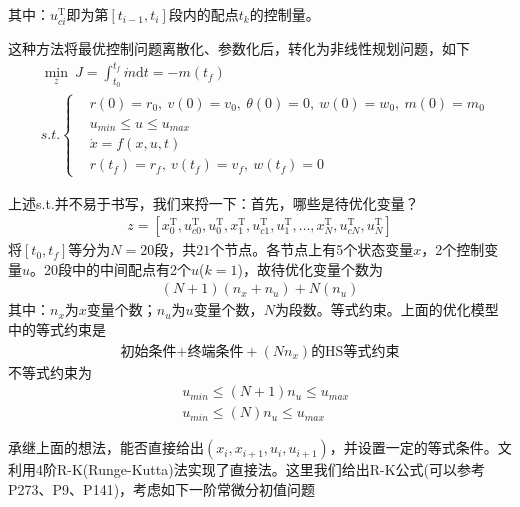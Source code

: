             其中：$u_{ci}^\mathrm{T}$即为第$[t_{i-1},t_i]$段内的配点$t_k$的控制量。
            \par
            这种方法将最优控制问题离散化、参数化后，转化为非线性规划问题，如下
            \begin{align*}
            & \min_z \ J = \int_{t_0}^{t_f}\dot{m}\mathrm{d}t = -m(t_f)\\
            & s.t.\left\{
            \begin{aligned}
            & r(0) = r_0,\ v(0) = v_0,\ \theta(0) = 0,\ w(0) = w_0,\ m(0) = m_0\\
            & u_{min} \leqslant u \leqslant u_{max}\\
            & \dot{x} = f(x,u,t)\\
            & r(t_f)=r_f,\ v(t_f) = v_f,\ w(t_f) = 0
            \end{aligned}
            \right.
            \end{align*}
            \par
            上述s.t.并不易于书写，我们来捋一下：首先，哪些是待优化变量？
            \begin{align*}
            z = [x_0^\mathrm{T},u_{c0}^\mathrm{T},u_0^\mathrm{T},x_1^\mathrm{T},u_{c1}^\mathrm{T},u_1^\mathrm{T},\dots,x_N^\mathrm{T},u_{cN}^\mathrm{T},u_N^\mathrm{T}]
            \end{align*}
            将$[t_0,t_f]$等分为$N = 20$段，共$21$个节点。各节点上有5个状态变量$x$，2个控制变量$u$。20段中的中间配点有2个$u$($k=1$)，故待优化变量个数为
            \begin{align*}
            (N+1)(n_x+n_u)+N(n_u)
            \end{align*}
            其中：$n_x$为$x$变量个数；$n_u$为$u$变量个数，$N$为段数。等式约束。上面的优化模型中的等式约束是
            \begin{align*}
            \text{初始条件+终端条件}+(Nn_x)\text{的HS等式约束}
            \end{align*}
            不等式约束为
            \begin{align*}
            & u_{min} \leqslant (N+1)n_u \leqslant u_{max}\\
            & u_{min} \leqslant (N)n_u \leqslant u_{max}
            \end{align*}
            \par
            承继上面的想法，能否直接给出$(x_i,x_{i+1},u_i,u_{i+1})$，并设置一定的等式条件。文\cite{Sun.2006}利用4阶R-K(Runge-Kutta)法实现了直接法。这里我们给出R-K公式(可以参考\cite{Li}P273、\cite{Hu}P9、\cite{Chen}P141)，考虑如下一阶常微分初值问题
